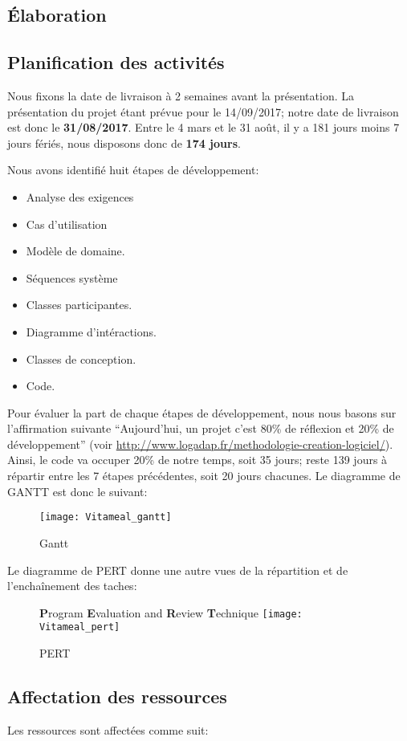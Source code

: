 \textcolor[RGB]{46, 116, 181}{\chapter{Élaboration}}
\section{Planification des activités}
Nous fixons la date de livraison à 2 semaines avant la présentation. La présentation du projet étant prévue pour le 14/09/2017; notre date de livraison est donc le \textbf{31/08/2017}. Entre le 4 mars et le 31 août, il y a 181 jours moins 7 jours fériés, nous disposons donc de \textbf{174 jours}.

Nous avons identifié huit étapes de développement:
\begin{itemize}
\item Analyse des exigences
\item Cas d'utilisation
\item Modèle de domaine.
\item Séquences système
\item Classes participantes.
\item Diagramme d'intéractions.
\item Classes de conception.
\item Code.
\end{itemize}
Pour évaluer la part de chaque étapes de développement, nous nous basons sur l'affirmation suivante \enquote{Aujourd'hui, un projet c'est 80\% de réflexion et 20\% de développement} (voir \url{http://www.logadap.fr/methodologie-creation-logiciel/}). Ainsi, le code va occuper 20\% de notre temps, soit 35 jours; reste 139 jours à répartir entre les 7 étapes précédentes, soit 20 jours chacunes.
Le diagramme de GANTT est donc le suivant:
\begin{figure}[H]
\label{Gantt}
  \centering
      \texttt{[image: Vitameal\_gantt]} %
\caption{Gantt}
\end{figure}

Le diagramme de PERT donne une autre vues de la répartition et de l'enchaînement des taches:
\begin{figure}[H]
\textbf{P}rogram \textbf{E}valuation and \textbf{R}eview \textbf{T}echnique
\label{PERT}
  \centering
      \texttt{[image: Vitameal\_pert]} %
\caption{PERT}
\end{figure}

\section{Affectation des ressources}
Les ressources sont affectées comme suit:

